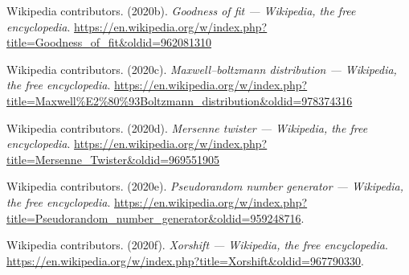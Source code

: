\documentclass[
]{article}
\newlength{\cslhangindent}
\newenvironment{cslreferences}%
  {\setlength{\parindent}{0pt}%
  \everypar{\setlength{\hangindent}{\cslhangindent}}\ignorespaces}%
  {\par}
\begin{document}
\begin{cslreferences}
\leavevmode\hypertarget{ref-wiki:goodnessoffit}{}%
Wikipedia contributors. (2020b). \emph{Goodness of fit --- Wikipedia,
the free encyclopedia}.
\url{https://en.wikipedia.org/w/index.php?title=Goodness_of_fit\&oldid=962081310}

\leavevmode\hypertarget{ref-wiki:maxwell_boltzmann}{}%
Wikipedia contributors. (2020c). \emph{Maxwell--boltzmann distribution
--- Wikipedia, the free encyclopedia}.
\url{https://en.wikipedia.org/w/index.php?title=Maxwell\%E2\%80\%93Boltzmann_distribution\&oldid=978374316}

\leavevmode\hypertarget{ref-wiki:mersennetwister}{}%
Wikipedia contributors. (2020d). \emph{Mersenne twister --- Wikipedia,
the free encyclopedia}.
\url{https://en.wikipedia.org/w/index.php?title=Mersenne_Twister\&oldid=969551905}

\leavevmode\hypertarget{ref-wiki:prng}{}%
Wikipedia contributors. (2020e). \emph{Pseudorandom number generator ---
Wikipedia, the free encyclopedia}.
\url{https://en.wikipedia.org/w/index.php?title=Pseudorandom_number_generator\&oldid=959248716}.

\leavevmode\hypertarget{ref-wiki:xorshift}{}%
Wikipedia contributors. (2020f). \emph{Xorshift --- Wikipedia, the free
encyclopedia}.
\url{https://en.wikipedia.org/w/index.php?title=Xorshift\&oldid=967790330}.
\end{cslreferences}
\end{document}
